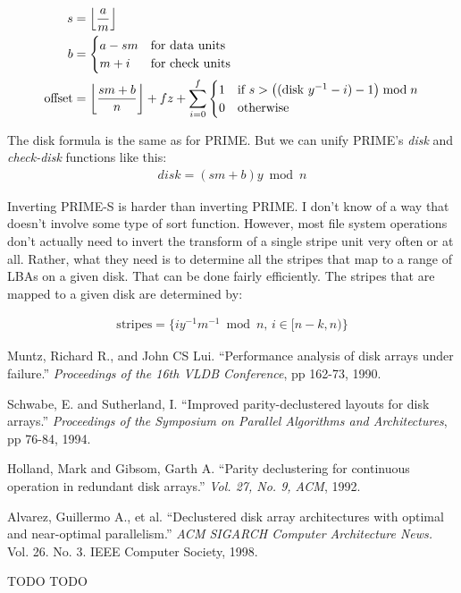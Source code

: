 \documentclass[onecolumn,draft]{IEEEtran}
\DeclarePairedDelimiter\floor{\lfloor}{\rfloor}
\begin{document}
\begin{align}
	s &= \floor*{\frac{a}{m}} \\
	b &= \begin{cases}
		a - s m & \text{for data units} \\
		m + i & \text{for check units}
	\end{cases} \\
	\text{offset} &= \floor*{\frac{s m + b}{n}} + f z +
	\displaystyle\sum_{i=0}^{f} \begin{cases}
		1 & \text{if } s > \big((\text{disk } y^{-1} - i) - 1\big) \bmod n \\
		0 & \text{otherwise}
	\end{cases}
\end{align}

The disk formula is the same as for PRIME.  But we can unify PRIME's \emph{disk} and \emph{check-disk} functions like this:
\begin{align}
	disk = (s m + b) y \bmod n
\end{align}

Inverting PRIME-S is harder than inverting PRIME.  I don't know of a way that
doesn't involve some type of sort function.  However, most file system
operations don't actually need to invert the transform of a single stripe unit
very often or at all.  Rather, what they need is to determine all the stripes
that map to a range of LBAs on a given disk.  That can be done fairly
efficiently.  The stripes that are mapped to a given disk are determined by:

\begin{align}
	\text{stripes} = \{ i y^{-1} m^{-1} \bmod n\text{, } i \in [n - k, n) \}
\end{align}

\begin{thebibliography}{99}

 Muntz, Richard R., and John CS Lui. ``Performance analysis
of disk arrays under failure.'' \emph{Proceedings of the 16th VLDB Conference},
pp 162-73, 1990.

 Schwabe, E. and Sutherland, I.  ``Improved
parity-declustered layouts for disk arrays.'' \emph{Proceedings of the
Symposium on Parallel Algorithms and Architectures}, pp 76-84, 1994.

 Holland, Mark and Gibsom, Garth A. ``Parity declustering for
continuous operation in redundant disk arrays.'' \emph{Vol. 27, No. 9, ACM},
1992.

 Alvarez, Guillermo A., et al. ``Declustered disk array
architectures with optimal and near-optimal parallelism.'' \emph{ACM SIGARCH
Computer Architecture News.} Vol. 26. No. 3. IEEE Computer Society, 1998.

 TODO
 TODO

\end{thebibliography}
\end{document}
